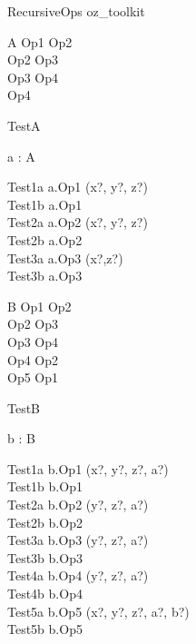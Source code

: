\begin{zsection}
  \SECTION RecursiveOps \parents oz\_toolkit
\end{zsection}

\begin{class}{A}
  Op1 \sdef Op2 \\
  Op2 \sdef Op3 \\
  Op3 \sdef Op4 \land [z? : \nat]\\
  Op4 
\end{class}

\begin{class}{TestA}
  \begin{state}
   a : A
  \end{state}
  Test1a \sdef a.Op1 \hide (x?, y?, z?)\\
  Test1b \sdef a.Op1 \\
  Test2a \sdef a.Op2 \hide (x?, y?, z?)\\
  Test2b \sdef a.Op2 \\
  Test3a \sdef a.Op3 \hide (x?,z?)\\
  Test3b \sdef a.Op3 \\
\end{class}

\begin{class}{B}
  Op1 \sdef Op2 \\
  Op2 \sdef Op3 \\
  Op3 \sdef Op4 \\
  Op4 \sdef [a? : \nat] \land Op2\\
  Op5 \sdef [b? : \nat] \land Op1
\end{class}

\begin{class}{TestB}
  \begin{state}
   b : B
  \end{state}
  Test1a \sdef b.Op1 \hide (x?,  y?, z?, a?)\\
  Test1b \sdef b.Op1 \\
  Test2a \sdef b.Op2 \hide (y?, z?, a?)\\
  Test2b \sdef b.Op2 \\
  Test3a \sdef b.Op3 \hide (y?, z?, a?)\\
  Test3b \sdef b.Op3 \\
  Test4a \sdef b.Op4 \hide (y?, z?, a?)\\
  Test4b \sdef b.Op4 \\
  Test5a \sdef b.Op5 \hide (x?,  y?, z?, a?, b?)\\
  Test5b \sdef b.Op5 \\
\end{class}
